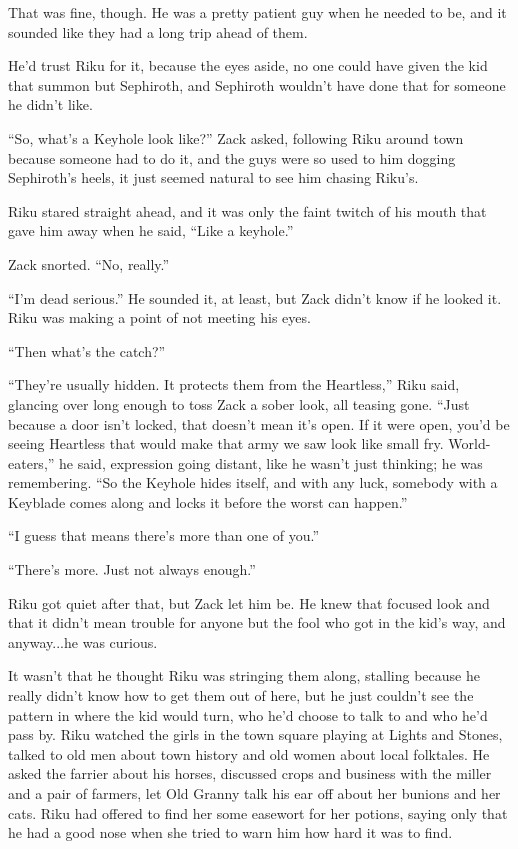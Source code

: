 That was fine, though. He was a pretty patient guy when he needed to be, and it sounded like they had a long trip ahead of them.

He'd trust Riku for it, because the eyes aside, no one could have given the kid that summon but Sephiroth, and Sephiroth wouldn't have done that for someone he didn't like.


\scenechange


``So, what's a Keyhole look like?'' Zack asked, following Riku around town because someone had to do it, and the guys were so used to him dogging Sephiroth's heels, it just seemed natural to see him chasing Riku's.

Riku stared straight ahead, and it was only the faint twitch of his mouth that gave him away when he said, ``Like a keyhole.''

Zack snorted. ``No, really.''

``I'm dead serious.'' He sounded it, at least, but Zack didn't know if he looked it. Riku was making a point of not meeting his eyes.

``Then what's the catch?''

``They're usually hidden. It protects them from the Heartless,'' Riku said, glancing over long enough to toss Zack a sober look, all teasing gone. ``Just because a door isn't locked, that doesn't mean it's open. If it were open, you'd be seeing Heartless that would make that army we saw look like small fry. World-eaters,'' he said, expression going distant, like he wasn't just thinking; he was remembering. ``So the Keyhole hides itself, and with any luck, somebody with a Keyblade comes along and locks it before the worst can happen.''

``I guess that means there's more than one of you.''

``There's more. Just not always enough.''

Riku got quiet after that, but Zack let him be. He knew that focused look and that it didn't mean trouble for anyone but the fool who got in the kid's way, and anyway...he was curious.

It wasn't that he thought Riku was stringing them along, stalling because he really didn't know how to get them out of here, but he just couldn't see the pattern in where the kid would turn, who he'd choose to talk to and who he'd pass by. Riku watched the girls in the town square playing at Lights and Stones, talked to old men about town history and old women about local folktales. He asked the farrier about his horses, discussed crops and business with the miller and a pair of farmers, let Old Granny talk his ear off about her bunions and her cats. Riku had offered to find her some easewort for her potions, saying only that he had a good nose when she tried to warn him how hard it was to find.

